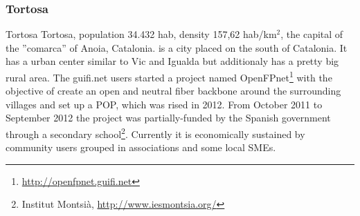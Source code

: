 \FloatBarrier
\subsubsection{Tortosa}
Tortosa {Tortosa, population 34.432 hab, density 157,62 hab/km$^{2}$, the capital of the ''comarca'' of Anoia, Catalonia.} is a city placed on the south of Catalonia. It has a urban center similar to Vic and Igualda but additionaly has a pretty big rural area. The guifi.net users started a project named  OpenFPnet\footnote{\url{http://openfpnet.guifi.net}} with the objective of create an open and neutral fiber backbone around the surrounding villages and set up a POP, which was rised in 2012. From October 2011 to September 2012 the project was partially-funded by the Spanish government through a secondary school\footnote{Institut Montsià, \url{http://www.iesmontsia.org/}}. Currently it is economically sustained by community users grouped in associations and some local SMEs.


